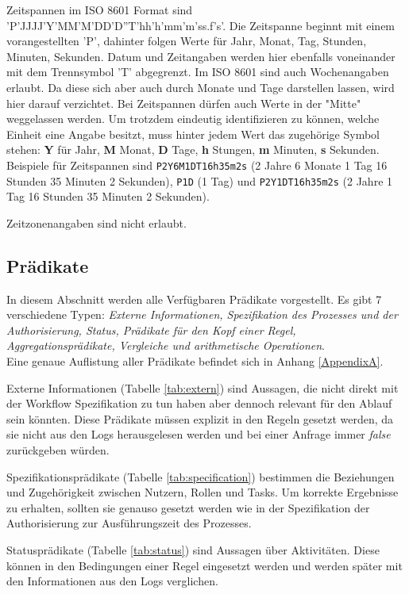 Zeitspannen im ISO 8601 Format sind 'P'JJJJ'Y'MM'M'DD'D''T'hh'h'mm'm'ss.f's'. Die Zeitspanne beginnt mit einem vorangestellten 'P', dahinter folgen Werte für Jahr, Monat, Tag, Stunden, Minuten, Sekunden. Datum und Zeitangaben werden hier ebenfalls voneinander mit dem Trennsymbol 'T' abgegrenzt. Im ISO 8601 sind auch Wochenangaben erlaubt. Da diese sich aber auch durch Monate und Tage darstellen lassen, wird hier darauf verzichtet. Bei Zeitspannen dürfen auch Werte in der "Mitte" weggelassen werden. Um trotzdem eindeutig identifizieren zu können, welche Einheit eine Angabe besitzt, muss hinter jedem Wert das zugehörige Symbol stehen: \textbf{Y} für Jahr, \textbf{M} Monat, \textbf{D} Tage, \textbf{h} Stungen, \textbf{m} Minuten, \textbf{s} Sekunden. Beispiele für Zeitspannen sind \texttt{P2Y6M1DT16h35m2s} (2 Jahre 6 Monate 1 Tag 16 Stunden 35 Minuten 2 Sekunden), \texttt{P1D} (1 Tag) und \texttt{P2Y1DT16h35m2s} (2 Jahre 1 Tag 16 Stunden 35 Minuten 2 Sekunden).

Zeitzonenangaben sind nicht erlaubt.

\subsection{Prädikate}
In diesem Abschnitt werden alle Verfügbaren Prädikate vorgestellt. Es gibt  7 verschiedene Typen: \textit{Externe Informationen, Spezifikation des Prozesses und der Authorisierung, Status, Prädikate für den Kopf einer Regel, Aggregationsprädikate, Vergleiche und arithmetische Operationen}. \\

Eine genaue Auflistung aller Prädikate befindet sich in Anhang {\ref{AppendixA}}.

Externe Informationen (Tabelle \ref{tab:extern}) sind Aussagen, die nicht direkt mit der Workflow Spezifikation zu tun haben aber dennoch relevant für den Ablauf sein könnten. Diese Prädikate müssen explizit in den Regeln gesetzt werden, da sie nicht aus den Logs herausgelesen werden und bei einer Anfrage immer \textit{false} zurückgeben würden.


Spezifikationsprädikate (Tabelle \ref{tab:specification}) bestimmen die Beziehungen und Zugehörigkeit zwischen Nutzern, Rollen und Tasks. Um korrekte Ergebnisse zu erhalten, sollten sie genauso gesetzt werden wie in der Spezifikation der Authorisierung zur Ausführungszeit des Prozesses.


Statusprädikate (Tabelle \ref{tab:status}) sind Aussagen über Aktivitäten. Diese können in den Bedingungen einer Regel eingesetzt werden und werden später mit den Informationen aus den Logs verglichen. 


